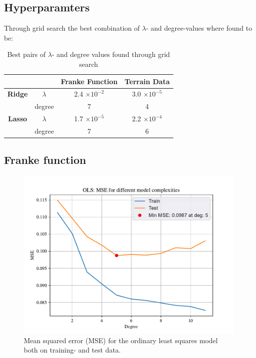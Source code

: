 \subsection{Hyperparamters}

Through grid search the best combination of $\lambda$- and degree-values where found to be: 

\begin{table}[h!]
    \centering
    \begin{tabular}{|c|c|c|c|}
        \hline
        & & \textbf{Franke Function} & \textbf{Terrain Data} \\ \hline
        \textbf{Ridge} & $\lambda$ & 2.4 $\times 10^{-2}$ & 3.0 $\times 10^{-5}$ \\ 
         & degree & 7 & 4 \\ \hline
        \textbf{Lasso} & $\lambda$ & 1.7 $\times 10^{-5}$ & 2.2 $\times 10^{-4}$ \\ 
         & degree & 7 & 6 \\ \hline
    \end{tabular}
    \caption{Best pairs of $\lambda$- and degree values found through grid search}
    \label{tab:grid}
\end{table}


\subsection{Franke function}


\begin{figure}[h!]
    \centering
    \includegraphics[width=1\linewidth]{project_1_alt/figures/figures_in_report/OLS_MSE_Franke_Noise.pdf}
    \caption{Mean squared error (MSE) for the ordinary least squares model both on training- and test data.}
    \label{fig:mseols}
\end{figure}

